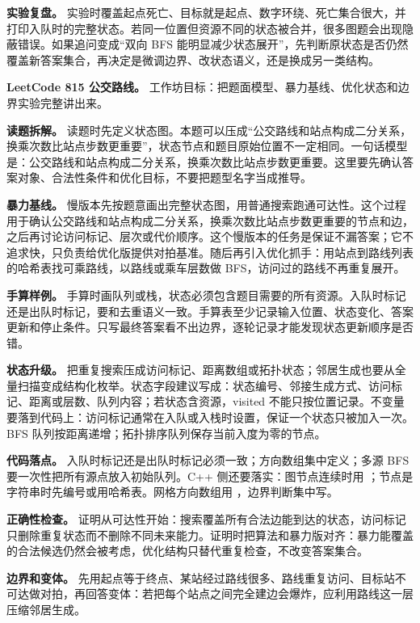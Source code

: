 \textbf{实验复盘。} 实验时覆盖起点死亡、目标就是起点、数字环绕、死亡集合很大，并打印入队时的完整状态。若同一位置但资源不同的状态被合并，很多图题会出现隐蔽错误。如果追问变成“双向 BFS 能明显减少状态展开”，先判断原状态是否仍然覆盖新答案集合，再决定是微调边界、改状态语义，还是换成另一类结构。

\noindent\textbf{LeetCode 815 公交路线。} 工作坊目标：把题面模型、暴力基线、优化状态和边界实验完整讲出来。

\textbf{读题拆解。} 读题时先定义状态图。本题可以压成“公交路线和站点构成二分关系，换乘次数比站点步数更重要”，状态节点和题目原始位置不一定相同。一句话模型是：公交路线和站点构成二分关系，换乘次数比站点步数更重要。这里要先确认答案对象、合法性条件和优化目标，不要把题型名字当成推导。

\textbf{暴力基线。} 慢版本先按题意画出完整状态图，用普通搜索跑通可达性。这个过程用于确认公交路线和站点构成二分关系，换乘次数比站点步数更重要的节点和边，之后再讨论访问标记、层次或代价顺序。这个慢版本的任务是保证不漏答案；它不追求快，只负责给优化版提供对拍基准。随后再引入优化抓手：用站点到路线列表的哈希表找可乘路线，以路线或乘车层数做 BFS，访问过的路线不再重复展开。

\textbf{手算样例。} 手算时画队列或栈，状态必须包含题目需要的所有资源。入队时标记还是出队时标记，要和去重语义一致。手算表至少记录输入位置、状态变化、答案更新和停止条件。只写最终答案看不出边界，逐轮记录才能发现状态更新顺序是否错。

\textbf{状态升级。} 把重复搜索压成访问标记、距离数组或拓扑状态；邻居生成也要从全量扫描变成结构化枚举。状态字段建议写成：状态编号、邻接生成方式、访问标记、距离或层数、队列内容；若状态含资源，visited 不能只按位置记录。不变量要落到代码上：访问标记通常在入队或入栈时设置，保证一个状态只被加入一次。BFS 队列按距离递增；拓扑排序队列保存当前入度为零的节点。

\textbf{代码落点。} 入队时标记还是出队时标记必须一致；方向数组集中定义；多源 BFS 要一次性把所有源点放入初始队列。C++ 侧还要落实：图节点连续时用 ；节点是字符串时先编号或用哈希表。网格方向数组用 ，边界判断集中写。

\textbf{正确性检查。} 证明从可达性开始：搜索覆盖所有合法边能到达的状态，访问标记只删除重复状态而不删除不同未来能力。证明时把算法和暴力版对齐：暴力能覆盖的合法候选仍然会被考虑，优化结构只替代重复检查，不改变答案集合。

\textbf{边界和变体。} 先用起点等于终点、某站经过路线很多、路线重复访问、目标站不可达做对拍，再回答变体：若把每个站点之间完全建边会爆炸，应利用路线这一层压缩邻居生成。

